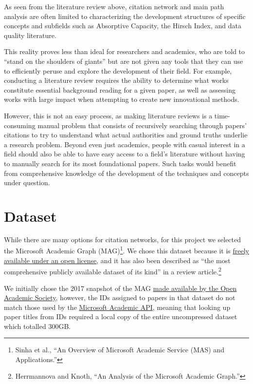 \documentclass[lettepaper,]{article}
\begin{document}
As seen from the literature review above, citation network and main path
analysis are often limited to characterizing the development structures
of specific concepts and subfields such as Absorptive Capacity, the
Hirsch Index, and data quality literature.

This reality proves less than ideal for researchers and academics, who
are told to ``stand on the shoulders of giants'' but are not given any
tools that they can use to efficiently peruse and explore the
development of their field. For example, conducting a literature review
requires the ability to determine what works constitute essential
background reading for a given paper, as well as assessing works with
large impact when attempting to create new innovational methods.

However, this is not an easy process, as making literature reviews is a
time-consuming manual problem that consists of recursively searching
through papers' citations to try to understand what actual authorities
and ground truths underlie a research problem. Beyond even just
academics, people with casual interest in a field should also be able to
have easy access to a field's literature without having to manually
search for its most foundational papers. Such tasks would benefit from
comprehensive knowledge of the development of the techniques and
concepts under question.

\hypertarget{dataset}{%
\section{Dataset}\label{dataset}}

While there are many options for citation networks, for this project we
selected the Microsoft Academic Graph (MAG)\footnote{Sinha et al., ``An
  Overview of Microsoft Academic Service (MAS) and Applications.''}. We
chose this dataset because it is
\href{https://docs.microsoft.com/en-us/academic-services/graph/get-started-setup-provisioning\#open-data-license-odc-by}{freely
available under an open license}, and it has also been described as
``the most comprehensive publicly available dataset of its kind'' in a
review article.\footnote{Herrmannova and Knoth, ``An Analysis of the
  Microsoft Academic Graph.''}

We initially chose the 2017 snapshot of the MAG
\href{https://www.openacademic.ai/oag/}{made available by the Open
Academic Society}, however, the IDs assigned to papers in that dataset
do not match those used by the
\href{https://labs.cognitive.microsoft.com/en-us/project-academic-knowledge}{Microsoft
Academic API}, meaning that looking up paper titles from IDs required a
local copy of the entire uncompressed dataset which totalled 300GB.
\end{document}
